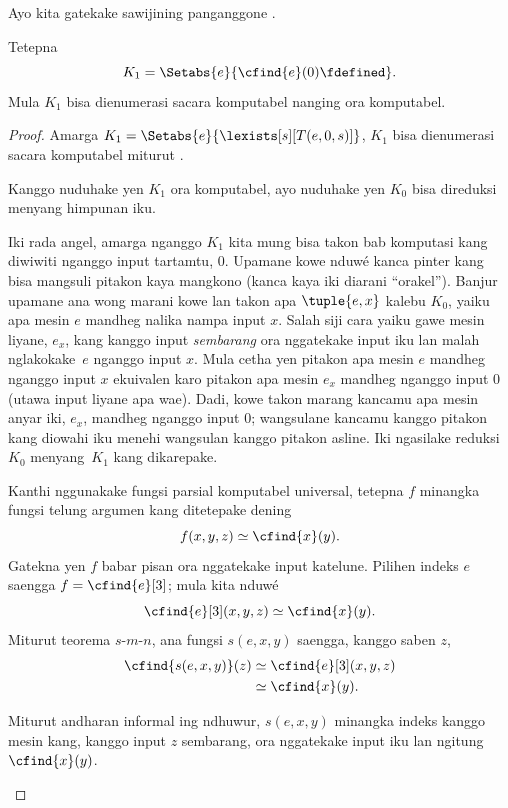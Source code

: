 \documentclass[../../../include/open-logic-section]{subfiles}
\begin{document}

Ayo kita gatekake sawijining panganggone .

\begin{prop}
Tetepna
\[
K_1 = \Setabs{e}{\cfind{e}(0) \fdefined}.
\]
Mula $K_1$ bisa dienumerasi sacara komputabel nanging ora komputabel.
\end{prop}

\begin{proof}
Amarga $K_1 = \Setabs{e}{\lexists[s][T(e,0,s)]}$, $K_1$ bisa
dienumerasi sacara komputabel miturut .

Kanggo nuduhake yen $K_1$ ora komputabel, ayo nuduhake yen $K_0$
bisa direduksi menyang himpunan iku.

\begin{explain}
Iki rada angel, amarga nganggo $K_1$ kita mung bisa
takon bab komputasi kang diwiwiti nganggo input tartamtu,
$0$. Upamane kowe nduwé kanca pinter kang bisa mangsuli
pitakon kaya mangkono (kanca kaya iki diarani ``orakel'').
Banjur upamane ana wong marani kowe lan takon apa
$\tuple{e,
  x}$ kalebu $K_0$, yaiku apa mesin $e$ mandheg nalika
nampa input $x$. Salah siji cara yaiku gawe mesin liyane,
$e_x$, kang kanggo input \emph{sembarang} ora nggatekake
input iku lan malah nglakokake~$e$ nganggo input $x$.
Mula cetha yen pitakon apa mesin $e$ mandheg nganggo
input $x$ ekuivalen karo pitakon apa mesin $e_x$
mandheg nganggo input $0$ (utawa input liyane apa wae).
Dadi, kowe takon marang kancamu apa mesin anyar iki,
$e_x$, mandheg nganggo input $0$; wangsulane kancamu
kanggo pitakon kang diowahi iku menehi wangsulan
kanggo pitakon asline. Iki ngasilake reduksi $K_0$
menyang~$K_1$ kang dikarepake.
\end{explain}

Kanthi nggunakake fungsi parsial komputabel universal,
tetepna $f$ minangka fungsi telung argumen kang
ditetepake dening
\[
f(x,y,z) \simeq \cfind{x}(y).
\]
Gatekna yen $f$ babar pisan ora nggatekake input katelune.
Pilihen indeks $e$ saengga $f = \cfind{e}[3]$; mula kita nduwé
\[
\cfind{e}[3](x,y,z) \simeq \cfind{x}(y).
\]
Miturut teorema $s$-$m$-$n$, ana fungsi $s(e,x,y)$ saengga,
kanggo saben $z$,
\begin{align*}
\cfind{s(e,x,y)}(z) & \simeq \cfind{e}[3](x,y,z) \\
& \simeq \cfind{x}(y).
\end{align*}

\begin{explain}
Miturut andharan informal ing ndhuwur, $s(e,x,y)$
minangka indeks kanggo mesin kang, kanggo input $z$
sembarang, ora nggatekake input iku lan ngitung
$\cfind{x}(y)$.
\end{explain}


\end{proof}
\end{document}
